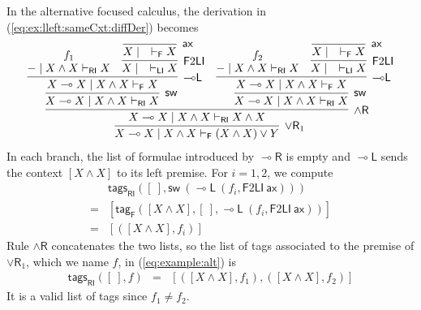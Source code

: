 \documentclass[submission,copyright,creativecommons]{eptcs}
\theoremstyle{definition}
\newcommand{\lright}{{\multimap}\mathsf{R}}
\newcommand{\lleft}{{\multimap}\mathsf{L}}
\newcommand{\pass}{\mathsf{pass}}
\newcommand{\andlone}{\land \mathsf{L}_{1}}
\newcommand{\andltwo}{\land \mathsf{L}_{2}}
\newcommand{\andr}{\land \mathsf{R}}
\newcommand{\orrone}{\lor \mathsf{R}_{1}}
\newcommand{\ax}{\mathsf{ax}}
\newcommand{\lolli}{\multimap}
\newcommand{\RI}{\mathsf{RI}}
\newcommand{\LI}{\mathsf{LI}}
\newcommand{\F}{\mathsf{F}}
\newcommand{\sw}{\mathsf{sw}}
\begin{document}
In the alternative focused calculus, the derivation in (\ref{eq:ex:lleft:sameCxt:diffDer}) becomes
\begin{equation}\label{eq:example:alt}
\begin{array}{l}
    \infer[\orrone]{X \lolli X \mid X \land X \vdash_\F (X \land X) \lor Y}{
    \infer[\andr]{X \lolli X \mid X \land X \vdash_\RI X \land X}{
      \infer[\sw]{X \lolli X \mid X \land X \vdash_\RI X}{
        \infer[\lleft]{X \lolli X \mid X \land X \vdash_\F X}{
          \deduce{{-} \mid X \land X \vdash_\RI X}{f_1} &
          \infer[\F 2 \LI]{X \mid \quad \vdash_\LI X}{\infer[\ax]{X \mid \quad \vdash_\F X}{}}
        }
      } &
      \infer[\sw]{X \lolli X \mid X \land X \vdash_\RI X}{
        \infer[\lleft]{X \lolli X \mid X \land X \vdash_\F X}{
          \deduce{{-} \mid X \land X \vdash_\RI X}{f_2} &
          \infer[\F 2 \LI]{X \mid \quad \vdash_\LI X}{\infer[\ax]{X \mid \quad \vdash_\F X}{}}
        }
      }
    } %
  }
  \end{array}
\end{equation}
In each branch, the list of formulae introduced by $\lright$ is empty and $\lleft$ sends the context $[X\land X]$ to its left premise. For $i=1,2$, we compute
\begin{displaymath}
  \begin{array}{rl}
    & \mathsf{tags}_{\RI}([~],\sw\ (\lleft\ (f_i,\F2\LI\ \ax))) \\
    = & [\mathsf{tag}_{\F}([X\land X],[~],\lleft\ (f_i,\F2\LI\ \ax))] \\
    = & [([X\land X],f_i)]
  \end{array}
\end{displaymath}
Rule $\andr$ concatenates the two lists, so the list of tags associated to the premise of $\orrone$, which we name $f$, in (\ref{eq:example:alt}) is
\begin{displaymath}
  \begin{array}{rcl}
    \mathsf{tags}_{\RI}([~],f)
    &=& [([X\land X],f_1),([X\land X],f_2)]
  \end{array}
\end{displaymath}
It is a valid list of tags since $f_1 \neq f_2$.
\end{document}
